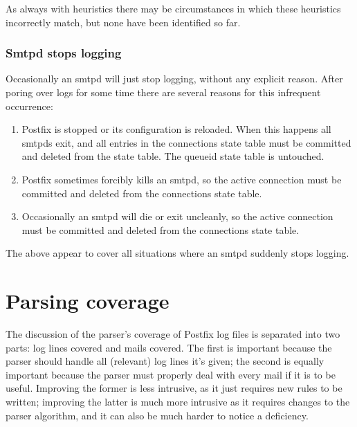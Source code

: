 \documentclass[a4paper,12pt,draft]{article}
\begin{document}
As always with heuristics there may be circumstances in which these
heuristics incorrectly match, but none have been identified so far.

\subsubsection{Smtpd stops logging}

\label{smtpd stops logging}

Occasionally an smtpd will just stop logging, without any explicit reason.
After poring over logs for some time there are several reasons for this
infrequent occurrence:

\begin{enumerate}

    \item Postfix is stopped or its configuration is reloaded.  When this
        happens all smtpds exit, and all entries in the connections state
        table must be committed and deleted from the state table.  The
        queueid state table is untouched.

    \item Postfix sometimes forcibly kills an smtpd, so the active
        connection must be committed and deleted from the connections state
        table.

    \item Occasionally an smtpd will die or exit uncleanly, so the active
        connection must be committed and deleted from the connections state
        table.

\end{enumerate}

The above appear to cover all situations where an smtpd suddenly stops
logging.


\section{Parsing coverage}

The discussion of the parser's coverage of Postfix log files is separated
into two parts: log lines covered and mails covered.  The first is
important because the parser should handle all (relevant) log lines it's
given; the second is equally important because the parser must properly
deal with every mail if it is to be useful.  Improving the former is
less intrusive, as it just requires new rules to be written; improving the
latter is much more intrusive as it requires changes to the parser
algorithm, and it can also be much harder to notice a deficiency.
\end{document}
